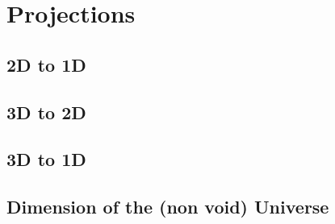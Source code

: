 \section{Projections}

\subsection{2D to 1D}
\subsection{3D to 2D}
\subsection{3D to 1D}
\subsection{Dimension of the (non void) Universe}




